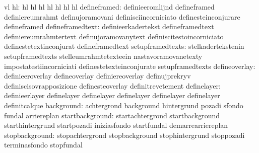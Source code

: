                                   vl
                              hl: hl                               hl
                                  hl                               hl
                                  hl                               hl
                                  hl
                    defineframed: definieeromlijnd                 defineframed
                                  definiereumrahmt                 definujoramovani
                                  definisciincorniciato            definesteinconjurare
                                  defineframed
                defineframedtext: definieerkadertekst              defineframedtext
                                  definiereumrahmtertext           definujoramovanytext
                                  definiscitestoincorniciato       definestetextinconjurat
                                  defineframedtext
                setupframedtexts: stelkadertekstenin               setupframedtexts
                                  stelleumrahmtetexteein           nastavoramovanetexty
                                  impostatestiincorniciati         definestetexteinconjurate
                                  setupframedtexts
                   defineoverlay: definieeroverlay                 defineoverlay
                                  definiereoverlay                 definujprekryv
                                  definiscisovrapposizione         definesteoverlay
                                  definitrevetement
                     definelayer: definieerlayer                   definelayer
                                  definelayer                      definelayer
                                  definelayer                      definelayer
                                  definitcalque
                      background: achtergrond                      background
                                  hintergrund                      pozadi
                                  sfondo                           fundal
                                  arriereplan
                 startbackground: startachtergrond                 startbackground
                                  starthintergrund                 startpozadi
                                  iniziasfondo                     startfundal
                                  demarrearriereplan
                  stopbackground: stopachtergrond                  stopbackground
                                  stophintergrund                  stoppozadi
                                  terminasfondo                    stopfundal
